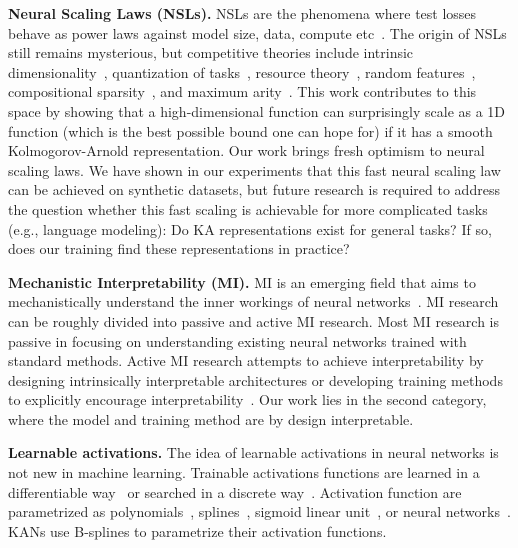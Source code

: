 \documentclass[12pt]{caltech_thesis}
\numberwithin{equation}{section}
\begin{document}
\textbf{Neural Scaling Laws (NSLs).} NSLs are the phenomena where test losses behave as power laws against model size, data, compute etc~\cite{kaplan2020scaling,henighan2020scaling,gordon2021data,hestness2017deep,sharma2020neural,bahri2021explaining,michaud2023the,song2024resource}. The origin of NSLs still remains mysterious, but competitive theories include intrinsic dimensionality~\cite{kaplan2020scaling}, quantization of tasks~\cite{michaud2023the}, resource theory~\cite{song2024resource}, random features~\cite{bahri2021explaining}, compositional sparsity~\cite{poggio2022deep}, and maximum  arity~\cite{michaud2023precision}. This work contributes to this space by showing that a high-dimensional function can surprisingly scale as a 1D function (which is the best possible bound one can hope for) if it has a smooth Kolmogorov-Arnold representation. Our work brings fresh optimism to neural scaling laws. We have shown in our experiments that this fast neural scaling law can be achieved on synthetic datasets, but future research is required to address the question  whether this fast scaling is achievable for more complicated tasks (e.g., language modeling): Do KA representations exist for general tasks? If so, does our training find these representations in practice?

\textbf{Mechanistic Interpretability (MI).} MI is an emerging field that aims to mechanistically understand the inner workings of neural networks~\cite{olsson2022context,meng2022locating,wang2023interpretability,elhage2022toy,nanda2023progress,zhong2023the,liu2023seeing,elhage2022solu,cunningham2023sparse}. MI research can be roughly divided into passive and active MI research. Most MI research is passive in focusing on understanding existing neural networks trained with standard methods. Active MI research attempts to achieve interpretability by designing intrinsically interpretable architectures or developing training methods to explicitly encourage interpretability~\cite{liu2023seeing,elhage2022solu}. Our work lies in the second category, where the model and training method are by design interpretable.   

\textbf{Learnable activations.} The idea of learnable activations in neural networks is not new in machine learning. Trainable activations functions are learned in a differentiable way~\cite{goyal2019learning, fakhoury2022exsplinet, ramachandran2017searching, zhang2022neural} or searched in a discrete way~\cite{bingham2022discovering}. Activation function are parametrized as polynomials~\cite{goyal2019learning}, splines~\cite{fakhoury2022exsplinet,bohra2020learning,aziznejad2019deep}, sigmoid linear unit~\cite{ramachandran2017searching}, or neural networks~\cite{zhang2022neural}. KANs use B-splines to parametrize their activation functions. 
\end{document}
